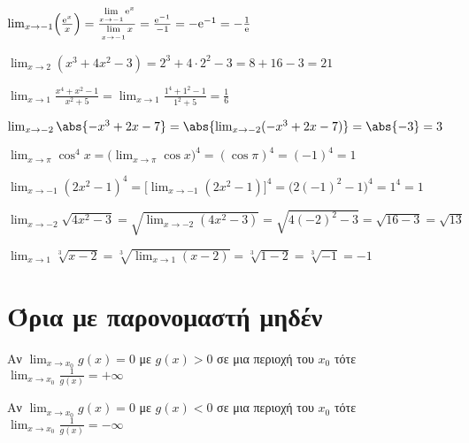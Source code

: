 \begin{example}
  $ \lim_{x \to -1} \Bigl(\frac{\mathrm{e}^{x}}{x}\Bigr) = \frac{\lim\limits_{x \to -1}
  \mathrm{e}^{x}}{\lim\limits_{x \to -1}x} = \frac{\mathrm{e}^{-1}}{-1} = -
  \mathrm{e}^{-1} = - \frac{1}{\mathrm{e}} $  
\end{example}

\begin{example}
  $ \lim_{x \to 2} (x^{3}+4x^{2}-3) = 2^{3}+ 4 \cdot 2^{2} -3 = 8+16-3 = 21 $  
\end{example}

\begin{example}
  $ \lim_{x \to 1} \frac{x^{4}+x^{2}-1}{x^{2}+5} = \lim_{x \to 1}
  \frac{1^{4}+1^{2}-1}{1^{2}+5} = \frac{1}{6} $
\end{example}

\begin{example}
  $ \lim_{x \to -2} \abs{-x^{3}+2x-7} = \abs{\lim_{x \to -2} (-x^{3}+2x-7)} = \abs{-3}
  = 3$ 
\end{example}

\begin{example}
  $ \lim_{x \to \pi} \cos^{4}{x} = \bigl(\lim_{x \to \pi} \cos{x} \bigr)^{4} =
  (\cos{\pi} )^{4} = (-1)^{4}=1 $
\end{example}

\begin{example} 
  $\lim_{x \to -1} (2x^{2}-1)^{4} = \bigl[\lim_{x \to -1}
  (2x^{2}-1)\bigr]^{4} = \bigl(2(-1)^{2}-1\bigr)^{4} = 1^{4} = 1 $ 
\end{example}

\begin{example}
  $ \lim_{x \to -2} \sqrt{4x^{2}-3} = \sqrt{\lim_{x \to -2} (4x^{2}-3)} =
  \sqrt{4(-2)^{2}-3} = \sqrt{16-3} = \sqrt{13} $    
\end{example}

\begin{example}
  $ \lim_{x \to 1} \sqrt[3]{x-2} = \sqrt[3]{\lim_{x \to 1} (x-2)} = \sqrt[3]{1-2} =
  \sqrt[3]{-1} = -1 $
\end{example}


\section{Όρια με παρονομαστή μηδέν}

\begin{prop}
\item {}
  \begin{myitemize}
    \item Αν $ \lim_{x \to x_{0}} g(x) = 0 $ με $ g(x)>0 $ σε μια περιοχή του $ x_{0} $ 
      τότε $ \lim_{x \to x_{0}} \frac{1}{g(x)} = + \infty $
    \item Αν $ \lim_{x \to x_{0}} g(x) = 0 $ με $ g(x)<0 $ σε μια περιοχή του $ x_{0} $ 
      τότε $ \lim_{x \to x_{0}} \frac{1}{g(x)} = - \infty $
  \end{myitemize}
\end{prop}

